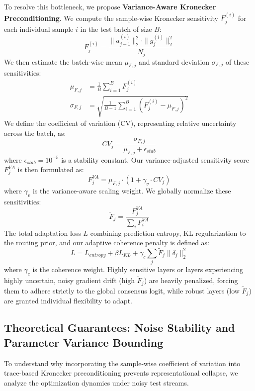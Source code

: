 \documentclass{article}
\theoremstyle{plain}
\theoremstyle{definition}
\theoremstyle{remark}
\begin{document}
To resolve this bottleneck, we propose \textbf{Variance-Aware Kronecker Preconditioning}. We compute the sample-wise Kronecker sensitivity $F_j^{(i)}$ for each individual sample $i$ in the test batch of size $B$:
\begin{equation}
    F_j^{(i)} = \frac{\|a_{j-1}^{(i)}\|_2^2 \cdot \|g_j^{(i)}\|_2^2}{N_j}
\end{equation}
We then estimate the batch-wise mean $\mu_{F, j}$ and standard deviation $\sigma_{F, j}$ of these sensitivities:
\begin{align}
    \mu_{F, j} &= \frac{1}{B} \sum_{i=1}^B F_j^{(i)} \\
    \sigma_{F, j} &= \sqrt{\frac{1}{B-1} \sum_{i=1}^B (F_j^{(i)} - \mu_{F, j})^2}
\end{align}
We define the coefficient of variation (CV), representing relative uncertainty across the batch, as:
\begin{equation}
    CV_j = \frac{\sigma_{F, j}}{\mu_{F, j} + \epsilon_{stab}}
\end{equation}
where $\epsilon_{stab} = 10^{-5}$ is a stability constant. Our variance-adjusted sensitivity score $F_j^{VA}$ is then formulated as:
\begin{equation}
    F_j^{VA} = \mu_{F, j} \cdot (1 + \gamma_v \cdot CV_j)
\end{equation}
where $\gamma_v$ is the variance-aware scaling weight. We globally normalize these sensitivities:
\begin{equation}
    \tilde{F}_j = \frac{F_j^{VA}}{\sum_i F_i^{VA}}
\end{equation}
The total adaptation loss $L$ combining prediction entropy, KL regularization to the routing prior, and our adaptive coherence penalty is defined as:
\begin{equation}
    L = L_{entropy} + \beta L_{KL} + \gamma_c \sum_j \tilde{F}_j \|\delta_j\|_2^2
\end{equation}
where $\gamma_c$ is the coherence weight. Highly sensitive layers or layers experiencing highly uncertain, noisy gradient drift (high $\tilde{F}_j$) are heavily penalized, forcing them to adhere strictly to the global consensus logit, while robust layers (low $\tilde{F}_j$) are granted individual flexibility to adapt.

\subsection{Theoretical Guarantees: Noise Stability and Parameter Variance Bounding}
To understand why incorporating the sample-wise coefficient of variation into trace-based Kronecker preconditioning prevents representational collapse, we analyze the optimization dynamics under noisy test streams.
\end{document}
